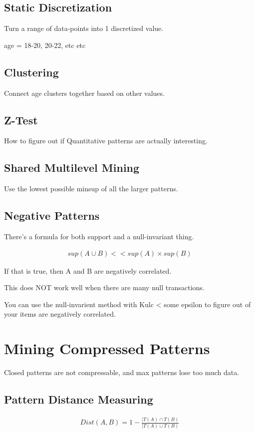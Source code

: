 \documentclass[fleqn]{report}
\newcommand{\equations} [1] {
\begin{gather*}
#1
\end{gather*}
}
\begin{document}
\subsection{Static Discretization}
Turn a range of data-points into 1 discretized value. 

age = 18-20, 20-22, etc etc 

\subsection{Clustering}
Connect age clusters together based on other values.

\subsection{Z-Test}
How to figure out if Quantitative patterns are actually 
interesting.

\subsection{Shared Multilevel Mining}
Use the lowest possible minsup of all the larger patterns.

\subsection{Negative Patterns}
There's a formula for both support and a null-invariant thing.

\equations{
    sup(A \cup B)
    << 
    sup(A) \times sup(B)
}

If that is true, then A and B are negatively correlated.

This does NOT work well when there are many null transactions.

You can use the null-invarient method with Kulc < some 
epsilon to figure out of your items are negatively 
correlated.

\section{Mining Compressed Patterns}
Closed patterns are not compressable, and max patterns 
lose too much data. 

\subsection{Pattern Distance Measuring}
\equations{
    Dist(A, B)
    =
    1
    -
    \frac{|T(A) \cap T(B)}{|T(A) \cup T(B)}
}
\end{document}
